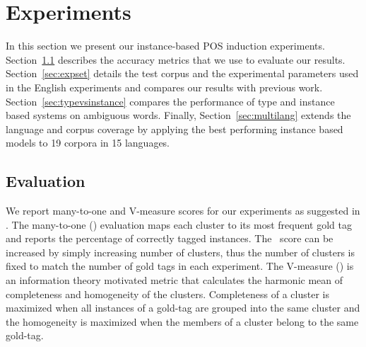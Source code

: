 \section{Experiments}
\label{sec:exp}

In this section we present our instance-based POS induction
experiments.  Section~\ref{sec:evaluation} describes the accuracy
metrics that we use to evaluate our results.  Section~\ref{sec:expset}
details the test corpus and the experimental parameters used in the
English experiments and compares our results with previous work.  
Section~\ref{sec:typevsinstance}
compares the performance of type and instance based systems on
ambiguous words.  Finally, Section~\ref{sec:multilang} extends the
language and corpus coverage by applying the best performing instance
based models to 19 corpora in 15 languages.

\subsection{Evaluation}
\label{sec:evaluation}
We report many-to-one and V-measure scores for our experiments as
suggested in \cite{Christodoulopoulos:2010:TDU:1870658.1870714}.  The
many-to-one (\mto) evaluation maps each cluster to its most frequent
gold tag and reports the percentage of correctly tagged instances.
The \mto\ score can be increased by simply increasing number of
clusters, thus the number of clusters is fixed to match the number of
gold tags in each experiment.  The V-measure (\vm)
\cite{rosenberg2007v} is an information theory motivated metric that
calculates the harmonic mean of completeness and homogeneity of the
clusters.  Completeness of a cluster is maximized when all instances
of a gold-tag are grouped into the same cluster and the homogeneity is
maximized when the members of a cluster belong to the same gold-tag.

